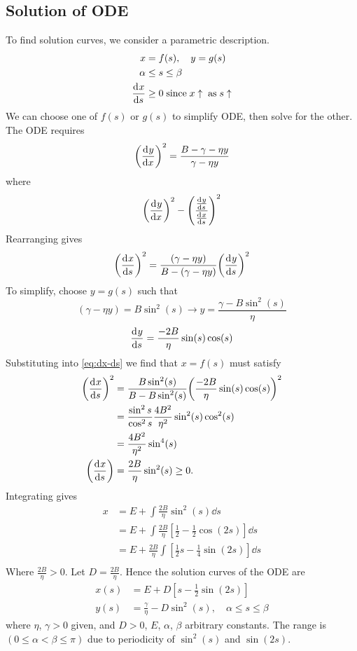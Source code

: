 \documentclass[12pt,twoside]{article}
\begin{document}
\subsection{Solution of ODE}
To find solution curves, we consider a parametric description.
\begin{align*}
  x &= f(s), \quad y = g(s) \\
  \alpha &\le s \le \beta \\
  \frac{\mathrm{d}^{} {x}}{\mathrm{d}{s}^{}}&\ge0 \;\text{since}\; x\uparrow \;\text{as}\; s\uparrow
\end{align*}
We can choose one of $f(s)$ or $g(s)$ to simplify ODE, then solve for the other.
The ODE requires
\begin{equation*}
  {\left(\ensuremath{\frac{\mathrm{d}^{} {y}}{\mathrm{d}{x}^{}}}\right)}^2 = \frac{B-\gamma-\eta y}{\gamma - \eta y}
\end{equation*}
where
\begin{equation*}
  {\left(\ensuremath{\frac{\mathrm{d}^{} {y}}{\mathrm{d}{x}^{}}}\right)}^2 - {\left( \frac{\frac{\mathrm{d}^{} {y}}{\mathrm{d}{s}^{}}}{\frac{\mathrm{d}^{} {x}}{\mathrm{d}{s}^{}}} \right)}^2
\end{equation*}
Rearranging gives
\begin{equation}
  \label{eq:dx-ds}
  {\left( \ensuremath{\frac{\mathrm{d}^{} {x}}{\mathrm{d}{s}^{}}} \right)}^2 = \frac{(\gamma-\eta y)}{B - (\gamma-\eta y)}{\left( \frac{\mathrm{d}^{} {y}}{\mathrm{d}{s}^{}} \right)}^2
\end{equation}
To simplify, choose $y=g(s)$ such that
\begin{equation*}
  (\gamma-\eta y) = B\sin^2(s) \rightarrow y = \frac{\gamma-B\sin^2(s)}{\eta}
\end{equation*}
\begin{equation*}
  \frac{\mathrm{d}^{} {y}}{\mathrm{d}{s}^{}} = \frac{-2B}{\eta}\sin(s)\cos(s)
\end{equation*}
Substituting into \cref{eq:dx-ds} we find that $x=f(s)$ must satisfy
\begin{align*}
{\left( \ensuremath{\frac{\mathrm{d}^{} {x}}{\mathrm{d}{s}^{}}} \right)}^2 &= \frac{B\sin^2(s)}{B-B\sin^2(s)}{\left( \frac{-2B}{\eta}\sin(s)\cos(s) \right)}^2 \\
                             &= \frac{\sin^2{s}}{\cos^2{s}}\frac{4B^2}{\eta^2}\sin^2(s)\cos^2(s) \\
                             &= \frac{4B^2}{\eta^2}\sin^4(s) \\
  \left( \frac{\mathrm{d}^{} {x}}{\mathrm{d}{s}^{}} \right) &= \frac{2B}{\eta}\sin^2(s) \ge 0.
\end{align*}
Integrating gives
\begin{align*}
  x &= E + \int\frac{2B}{\eta}\sin^2(s)\dd{s} \\
  &= E + \int\frac{2B}{\eta}\left[ \frac{1}{2}-\frac{1}{2}\cos(2s) \right]\dd{s} \\
  &= E + \frac{2B}{\eta} \int\left[ \frac{1}{2}s-\frac{1}{4}\sin(2s) \right]\dd{s} \\
\end{align*}
Where $\frac{2B}{\eta}>0$. Let $D=\frac{2B}{\eta}$. Hence the solution curves of
the ODE are
\begin{align*}
  x(s) &= E + D\left[ s-\frac{1}{2}\sin(2s) \right] \\
  y(s) &= \frac{\gamma}{\eta} -D\sin^2(s),\quad \alpha\le s\le\beta
\end{align*}
where $\eta$, $\gamma>0$ given, and $D>0$, $E$, $\alpha$, $\beta$ arbitrary
constants. The range is $(0\le\alpha<\beta\le\pi)$ due to periodicity of
$\sin^2(s)$ and $\sin(2s)$.
\end{document}
